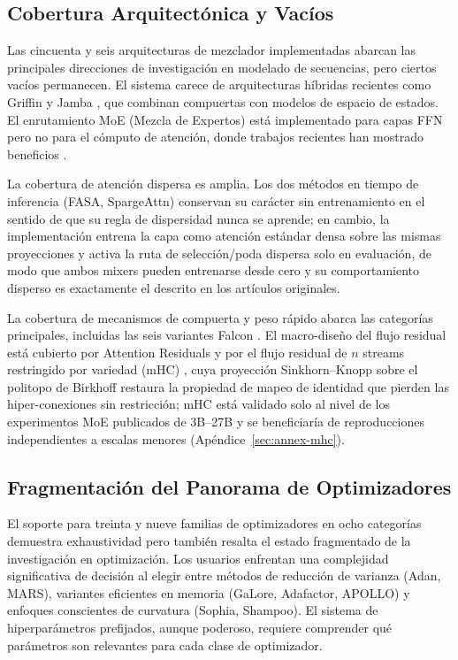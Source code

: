 \subsection{Cobertura Arquitectónica y Vacíos}

Las cincuenta y seis arquitecturas de mezclador implementadas abarcan las principales direcciones de investigación en modelado de secuencias, pero ciertos vacíos permanecen. El sistema carece de arquitecturas híbridas recientes como Griffin \citep{soares_griffin_2024} y Jamba \citep{gu_jamba_2024}, que combinan compuertas con modelos de espacio de estados. El enrutamiento MoE (Mezcla de Expertos) está implementado para capas FFN pero no para el cómputo de atención, donde trabajos recientes han mostrado beneficios \citep{lewis_moe_2021}.

La cobertura de atención dispersa es amplia. Los dos métodos en tiempo de inferencia (FASA, SpargeAttn) conservan su carácter sin entrenamiento en el sentido de que su regla de dispersidad nunca se aprende; en cambio, la implementación entrena la capa como atención estándar densa sobre las mismas proyecciones y activa la ruta de selección/poda dispersa solo en evaluación, de modo que ambos mixers pueden entrenarse desde cero y su comportamiento disperso es exactamente el descrito en los artículos originales.

La cobertura de mecanismos de compuerta y peso rápido abarca las categorías principales, incluidas las seis variantes Falcon \citep{zhang_falcon_2026}. El macro-diseño del flujo residual está cubierto por Attention Residuals \citep{sun_attnres_2026} y por el flujo residual de $n$ streams restringido por variedad (mHC) \citep{xie_mhc_2025}, cuya proyección Sinkhorn--Knopp sobre el politopo de Birkhoff restaura la propiedad de mapeo de identidad que pierden las hiper-conexiones sin restricción; mHC está validado solo al nivel de los experimentos MoE publicados de 3B--27B y se beneficiaría de reproducciones independientes a escalas menores (Apéndice~\ref{sec:annex-mhc}).

\subsection{Fragmentación del Panorama de Optimizadores}

El soporte para treinta y nueve familias de optimizadores en ocho categorías demuestra exhaustividad pero también resalta el estado fragmentado de la investigación en optimización. Los usuarios enfrentan una complejidad significativa de decisión al elegir entre métodos de reducción de varianza (Adan, MARS), variantes eficientes en memoria (GaLore, Adafactor, APOLLO) y enfoques conscientes de curvatura (Sophia, Shampoo). El sistema de hiperparámetros prefijados, aunque poderoso, requiere comprender qué parámetros son relevantes para cada clase de optimizador.

